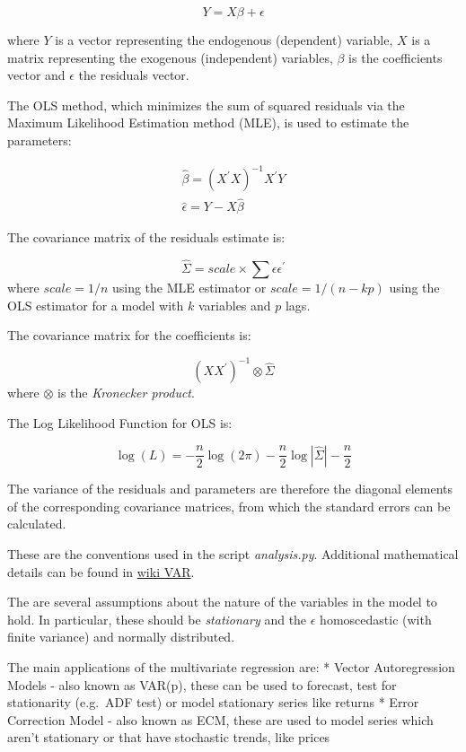 \documentclass{article}
\begin{document}
\[
Y = X \beta + \epsilon
\]

where \(Y\) is a vector representing the endogenous (dependent)
variable, \(X\) is a matrix representing the exogenous (independent)
variables, \(\beta\) is the coefficients vector and \(\epsilon\) the
residuals vector.

The OLS method, which minimizes the sum of squared residuals via the
Maximum Likelihood Estimation method (MLE), is used to estimate the
parameters:

\[
\begin{align}
\hat{\beta} = (X^\prime X)^{-1} X^\prime Y \\
\hat{\epsilon} = Y - X \hat{\beta}
\end{align}
\]

The covariance matrix of the residuals estimate is:

\[
\hat{\Sigma} = scale \times  \sum \epsilon \epsilon^\prime
\] where \(scale = 1/ n\) using the MLE estimator or
\(scale= 1/ (n - kp)\) using the OLS estimator for a model with \(k\)
variables and \(p\) lags.

The covariance matrix for the coefficients is:

\[
(X X^\prime)^{-1} \otimes \hat{\Sigma}
\] where \(\otimes\) is the \emph{Kronecker product}.

The Log Likelihood Function for OLS is:

\[
\log(L) = -\frac{n}{2}\log (2 \pi) -\frac{n}{2}\log | \hat{\Sigma}| - \frac{n}{2}
\]

The variance of the residuals and parameters are therefore the diagonal
elements of the corresponding covariance matrices, from which the
standard errors can be calculated.

These are the conventions used in the script \emph{analysis.py}.
Additional mathematical details can be found in
\href{https://en.wikipedia.org/wiki/Vector_autoregression}{wiki VAR}.

The are several assumptions about the nature of the variables in the
model to hold. In particular, these should be \emph{stationary} and the
\(\epsilon\) homoscedastic (with finite variance) and normally
distributed.

The main applications of the multivariate regression are: * Vector
Autoregression Models - also known as VAR(p), these can be used to
forecast, test for stationarity (e.g.~ADF test) or model stationary
series like returns * Error Correction Model - also known as ECM, these
are used to model series which aren't stationary or that have stochastic
trends, like prices
\end{document}
